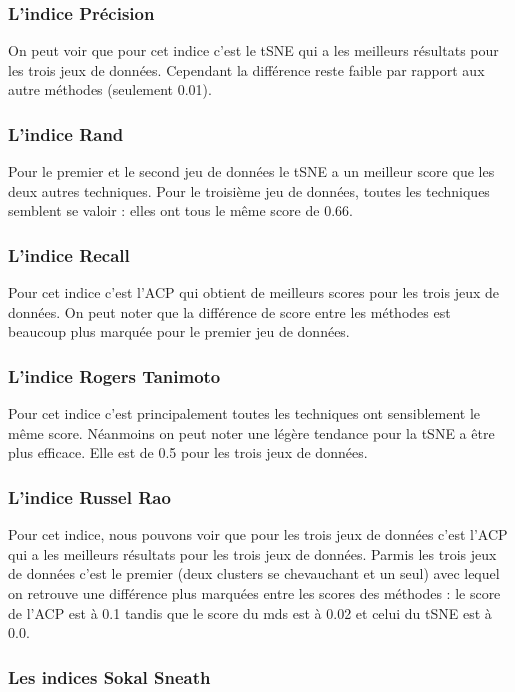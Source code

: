 \subsubsection{L'indice Précision}
On peut voir que pour cet indice c'est le tSNE qui a les meilleurs résultats pour les trois jeux de données.
Cependant la différence reste faible par rapport aux autre méthodes (seulement 0.01).

\subsubsection{L'indice Rand}
Pour le premier et le second jeu de données le tSNE a un meilleur score que les deux autres techniques.
Pour le troisième jeu de données, toutes les techniques semblent se valoir : elles ont tous le même score de 0.66.


\subsubsection{L'indice Recall}
Pour cet indice c'est l'ACP qui obtient de meilleurs scores pour les trois jeux de données.
On peut noter que la différence de score entre les méthodes est beaucoup plus marquée pour le premier jeu de données.


\subsubsection{L'indice Rogers Tanimoto}
Pour cet indice c'est principalement toutes les techniques ont sensiblement le même score. Néanmoins on peut noter une légère tendance 
pour la tSNE a être plus efficace. Elle est de 0.5 pour les trois jeux de données.

\subsubsection{L'indice Russel Rao}
Pour cet indice, nous pouvons voir que pour les trois jeux de données c'est l'ACP qui a les meilleurs résultats pour les trois jeux de données.
Parmis les trois jeux de données c'est le premier (deux clusters se chevauchant et un seul) avec lequel on retrouve une différence plus marquées entre 
les scores des méthodes : le score de l'ACP est à 0.1 tandis que le score du mds est à 0.02 et celui du tSNE est à 0.0.

\subsubsection{Les indices Sokal Sneath}

